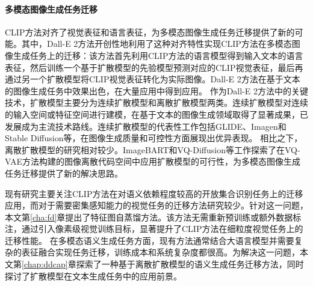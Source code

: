 \paragraph{多模态图像生成任务迁移}
CLIP方法对齐了视觉表征和语言表征，为多模态图像生成任务迁移提供了新的可能。其中，Dall-E 2方法\cite{dall-e2}开创性地利用了这种对齐特性实现CLIP方法在多模态图像生成任务上的迁移：该方法首先利用CLIP方法的语言模型得到输入文本的语言表征，然后训练一个基于扩散模型\cite{ddpm,ddim}的先验模型预测对应的CLIP视觉表征，最后再通过另一个扩散模型将CLIP视觉表征转化为实际图像。Dall-E 2方法在基于文本的图像生成任务中效果出色，在大量应用中得到应用。
作为Dall-E 2方法中的关键技术，扩散模型主要分为连续扩散模型和离散扩散模型两类。连续扩散模型\cite{beatsgan,ddpm,ddim,latentdiff}对连续的输入空间或特征空间进行建模，在基于文本的图像生成领域取得了显著成果，已发展成为主流技术路线。连续扩散模型的代表性工作包括GLIDE\cite{glide}、Imagen\cite{imagen}和Stable Diffusion\cite{latentdiff}等，在图像生成质量和可控性方面展现出优异表现。
相比之下，离散扩散模型的研究相对较少。ImageBART\cite{Imagebart}和VQ-Diffusion\cite{VQ-diffusion}等工作探索了在VQ-VAE\cite{dVAE,vqvae}方法构建的图像离散代码空间中应用扩散模型的可行性，为多模态图像生成任务迁移提供了新的解决思路。

现有研究主要关注CLIP方法在对语义依赖程度较高的开放集合识别任务上的迁移应用，而对于需要密集感知能力的视觉任务的迁移方法研究较少。针对这一问题，本文第\ref{cha:fd}章提出了特征图自蒸馏方法。该方法无需重新预训练或额外数据标注，通过引入像素级视觉训练目标，显著提升了CLIP方法在细粒度视觉任务上的迁移性能。
在多模态语义生成任务方面，现有方法通常结合大语言模型并需要复杂的表征融合实现任务迁移，训练成本和系统复杂度都很高。为解决这一问题，本文第\ref{chap:ddcap}章探索了一种基于离散扩散模型的语义生成任务迁移方法，同时探讨了扩散模型在文本生成任务中的应用前景。


